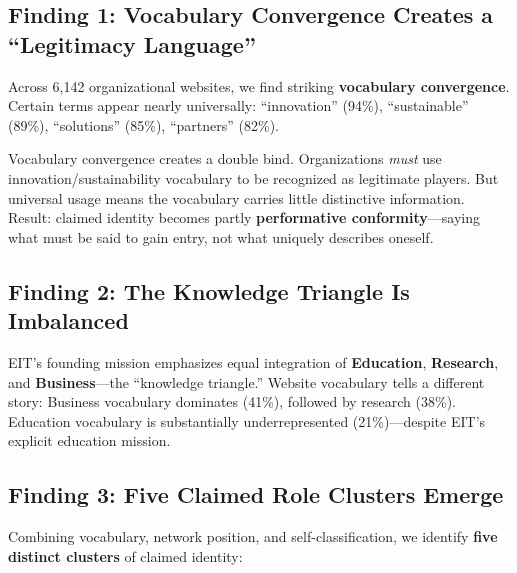\subsection*{Finding 1: Vocabulary Convergence Creates a ``Legitimacy Language''}

Across 6,142 organizational websites, we find striking \textbf{vocabulary convergence}. Certain terms appear nearly universally: ``innovation'' (94\%), ``sustainable'' (89\%), ``solutions'' (85\%), ``partners'' (82\%).

\begin{insightbox}
Vocabulary convergence creates a double bind. Organizations \emph{must} use innovation/sustainability vocabulary to be recognized as legitimate players. But universal usage means the vocabulary carries little distinctive information. Result: claimed identity becomes partly \textbf{performative conformity}---saying what must be said to gain entry, not what uniquely describes oneself.
\end{insightbox}

\subsection*{Finding 2: The Knowledge Triangle Is Imbalanced}

EIT's founding mission emphasizes equal integration of \textbf{Education}, \textbf{Research}, and \textbf{Business}---the ``knowledge triangle.'' Website vocabulary tells a different story: Business vocabulary dominates (41\%), followed by research (38\%). Education vocabulary is substantially underrepresented (21\%)---despite EIT's explicit education mission.


\subsection*{Finding 3: Five Claimed Role Clusters Emerge}

Combining vocabulary, network position, and self-classification, we identify \textbf{five distinct clusters} of claimed identity:

